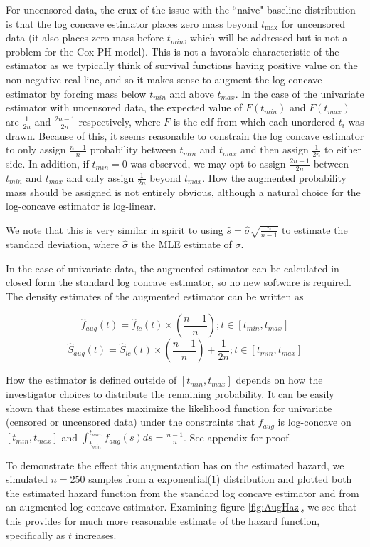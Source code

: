 \documentclass[11pt]{article}
\numberwithin{equation}{section}
\begin{document}
	For uncensored data, the crux of the issue with the ``naive" baseline distribution is that the log concave estimator places zero mass beyond $t_{\max}$ for uncensored data (it also places zero mass before $t_{min}$,  which will be addressed but is not a problem for the Cox PH model). This is not a favorable characteristic of the estimator as we typically think of survival functions having positive value on the non-negative real line, and so it makes sense to augment the log concave estimator by forcing mass below $t_{min}$ and above $t_{max}$. In the case of the univariate estimator with uncensored data, the expected value of $F(t_{min})$ and $F(t_{max})$ are $\frac{1}{2n}$ and $\frac{2n-1}{2n}$ respectively, where $F$ is the cdf from which each unordered $t_i$ was drawn. Because of this, it seems reasonable to constrain the log concave estimator to only assign $\frac{n-1}{n}$ probability between $t_{min}$ and $t_{max}$ and then assign $\frac{1}{2n}$ to either side. In addition, if $t_{min} = 0$ was observed, we may opt to assign $\frac{2n-1}{2n}$ between $t_{min}$ and $t_{max}$ and only assign $\frac{1}{2n}$ beyond $t_{max}$. How the augmented probability mass should be assigned is not entirely obvious, although a natural choice for the log-concave estimator is log-linear. 
	
	We note that this is very similar in spirit to using $\hat s = \hat \sigma \sqrt{\frac{n}{n-1}}$ to estimate the standard deviation, where $\hat \sigma$ is the MLE estimate of $\sigma$. 
	
	In the case of univariate data, the augmented estimator can be calculated in closed form the standard log concave estimator, so no new software is required. The density estimates of the augmented estimator can be written as 
	
	\[
	\hat f_{aug}(t) = \hat f_{lc}(t) \times \left(\frac{n-1}{n} \right); t \in [t_{min}, t_{max}]
	\]
	\[
	\hat S_{aug}(t) = \hat S_{lc}(t) \times \left( \frac{n-1}{n}  \right) + \frac{1}{2n}; t \in [t_{min}, t_{max}]
	\]
	
	How the estimator is defined outside of $[t_{min}, t_{max}]$ depends on how the investigator choices to distribute the remaining probability. It can be easily shown that these estimates maximize the likelihood function for univariate (censored or uncensored data) under the constraints that $f_{aug}$ is log-concave on $[t_{min}, t_{max}]$ and $\int_{t_{min}}^{t_{max}} f_{aug}(s) ds = \frac{n-1}{n}$. See appendix for proof. 
	
	To demonstrate the effect this augmentation has on the estimated hazard, we simulated $n = 250$ samples from a exponential(1) distribution and plotted both the estimated hazard function from the standard log concave estimator and from an augmented log concave estimator. Examining figure \ref{fig:AugHaz}, we see that this provides for much more reasonable estimate of the hazard function, specifically as $t$ increases. 
	
\end{document}
